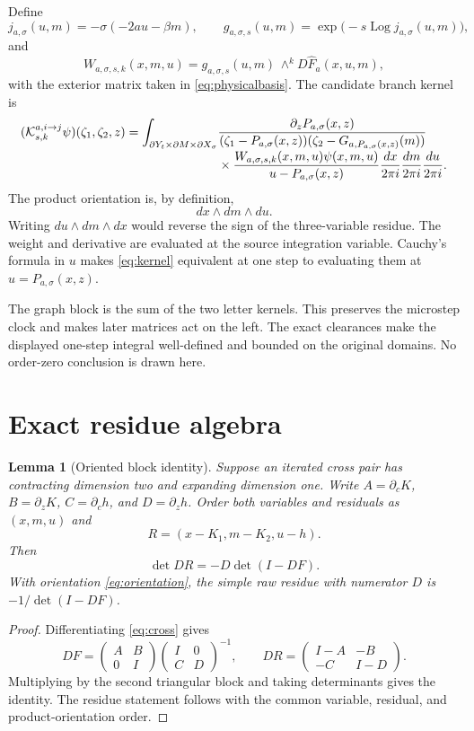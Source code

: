 \documentclass[11pt]{article}
\newtheorem{lemma}{Lemma}
\newcommand{\C}{\mathbb C}
\begin{document}
Define
\[
 j_{a,\sigma}(u,m)=-\sigma(-2au-\beta m),\qquad
 g_{a,\sigma,s}(u,m)=
 \exp\bigl(-s\operatorname{Log}j_{a,\sigma}(u,m)\bigr),
\]
and
\[
 W_{a,\sigma,s,k}(x,m,u)=
 g_{a,\sigma,s}(u,m)\,\wedge^kD\widehat F_a(x,u,m),
\]
with the exterior matrix taken in \eqref{eq:physicalbasis}.  The candidate
branch kernel is
\begin{align}\label{eq:kernel}
 (\mathcal K^{a,i\to j}_{s,k}\psi)(\zeta_1,\zeta_2,z)
 =\int_{\partial Y_t\times\partial M\times\partial X_\sigma}
 &\frac{\partial_zP_{a,\sigma}(x,z)}
 {(\zeta_1-P_{a,\sigma}(x,z))
  (\zeta_2-G_{a,P_{a,\sigma}(x,z)}(m))}
 \notag\\[-1mm]
 &\times
 \frac{W_{a,\sigma,s,k}(x,m,u)\psi(x,m,u)}
 {u-P_{a,\sigma}(x,z)}
 \frac{dx}{2\pi i}\frac{dm}{2\pi i}\frac{du}{2\pi i}.
\end{align}
The product orientation is, by definition,
\begin{equation}\label{eq:orientation}
 dx\wedge dm\wedge du.
\end{equation}
Writing $du\wedge dm\wedge dx$ would reverse the sign of the three-variable
residue.  The weight and derivative are evaluated at the source integration
variable.  Cauchy's formula in $u$ makes \eqref{eq:kernel} equivalent at one
step to evaluating them at $u=P_{a,\sigma}(x,z)$.

The graph block is the sum of the two letter kernels.  This preserves the
microstep clock and makes later matrices act on the left.  The exact
clearances make the displayed one-step integral well-defined and bounded on
the original domains.  No order-zero conclusion is drawn here.

\section{Exact residue algebra}

\begin{lemma}[Oriented block identity]\label{lem:sign}
Suppose an iterated cross pair has contracting dimension two and expanding
dimension one.  Write $A=\partial_cK$, $B=\partial_zK$,
$C=\partial_ch$, and $D=\partial_zh$.  Order both variables and residuals as
$(x,m,u)$ and
\[
 R=(x-K_1,m-K_2,u-h).
\]
Then
\[
 \det DR=-D\det(I-DF).
\]
With orientation \eqref{eq:orientation}, the simple raw residue with
numerator $D$ is $-1/\det(I-DF)$.
\end{lemma}

\begin{proof}
Differentiating \eqref{eq:cross} gives
\[
 DF=
 \begin{pmatrix}A&B\\0&I\end{pmatrix}
 \begin{pmatrix}I&0\\C&D\end{pmatrix}^{-1},
 \qquad
 DR=\begin{pmatrix}I-A&-B\\-C&I-D\end{pmatrix}.
\]
Multiplying by the second triangular block and taking determinants gives the
identity.  The residue statement follows with the common variable,
residual, and product-orientation order.
\end{proof}
\end{document}
